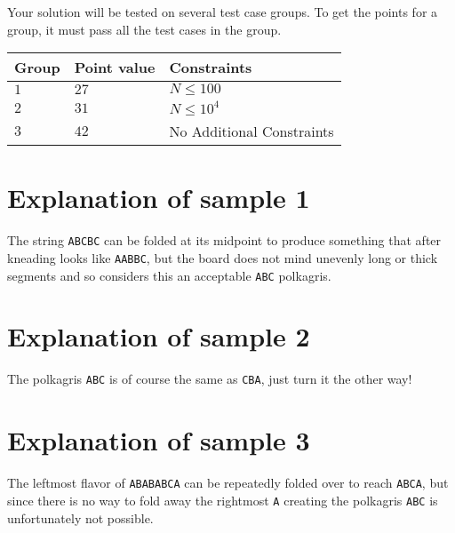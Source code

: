 Your solution will be tested on several test case groups. To get the points for
a group, it must pass all the test cases in the group.

\noindent
\begin{tabular}{| l | l | p{12cm} |}
  \hline
  \textbf{Group} & \textbf{Point value} & \textbf{Constraints} \\ \hline
  $1$    & $27$       & $N \leq 100$ \\ \hline
  $2$    & $31$       & $N \leq 10^4$ \\ \hline
  $3$    & $42$       & No Additional Constraints \\ \hline
\end{tabular}

\section*{Explanation of sample 1}

The string \verb|ABCBC| can be folded at its midpoint to produce something that after kneading looks
like \verb|AABBC|, but the board does not mind unevenly long or thick segments and so considers this
an acceptable \verb|ABC| polkagris.

\section*{Explanation of sample 2}

The polkagris \verb|ABC| is of course the same as \verb|CBA|, just turn it the other way!

\section*{Explanation of sample 3}

The leftmost flavor of \verb|ABABABCA| can be repeatedly folded over to reach \verb|ABCA|, but since
there is no way to fold away the rightmost \verb|A| creating the polkagris \verb|ABC| is
unfortunately not possible.

